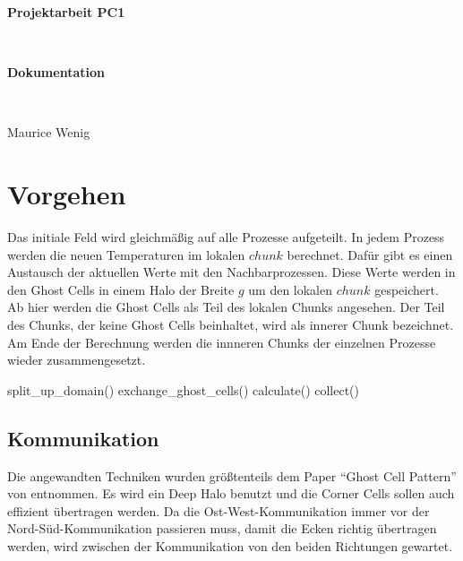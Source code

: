 \documentclass[12pt]{article}
\begin{document}
\thispagestyle{empty}
\begin{center}
    \begin{LARGE}
        \textbf{Projektarbeit PC1}
    \end{LARGE}\vspace{3mm}\\
    \begin{Large}
        \textbf{Dokumentation}
    \end{Large}\vspace{5mm}\\
    \begin{large}
        Maurice Wenig
    \end{large}
\end{center}
\tableofcontents
\clearpage

% 

\fancyhead[LO,RE]{\itshape\nouppercase\leftmark}
\section{Vorgehen}
Das initiale Feld wird gleichmäßig auf alle Prozesse aufgeteilt. In jedem Prozess werden die neuen Temperaturen im lokalen $chunk$ berechnet. Dafür gibt es einen Austausch der aktuellen Werte mit den Nachbarprozessen. Diese Werte werden in den Ghost Cells in einem Halo der Breite $g$ um den lokalen $chunk$ gespeichert.
Ab hier werden die Ghost Cells als Teil des lokalen Chunks angesehen. Der Teil des Chunks, der keine Ghost Cells beinhaltet, wird als innerer Chunk bezeichnet.
Am Ende der Berechnung werden die innneren Chunks der einzelnen Prozesse wieder zusammengesetzt.

\begin{algorithmic}[1]
    \State split\_up\_domain()
            \State exchange\_ghost\_cells()
        \EndIf
        \State calculate()
    \EndFor
    \State collect()
\end{algorithmic}
\subsection{Kommunikation}
Die angewandten Techniken wurden größtenteils dem Paper ``Ghost Cell Pattern'' von \citeauthor{Kjolstad2010} entnommen.
Es wird ein Deep Halo benutzt und die Corner Cells sollen auch effizient übertragen werden.
Da die Ost-West-Kommunikation immer vor der Nord-Süd-Kommunikation passieren muss, damit die Ecken richtig übertragen werden, wird zwischen der Kommunikation von den beiden Richtungen gewartet.
\end{document}
